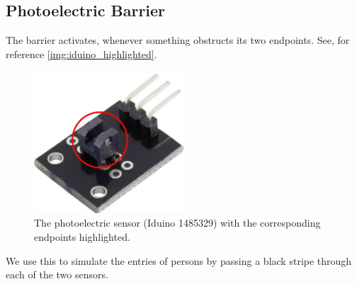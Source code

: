 \documentclass[]{article}
\begin{document}
\begin{sloppypar}
\subsection{Photoelectric Barrier}
The barrier activates, whenever something obstructs its two endpoints. See, for reference \eqref{img:iduino_highlighted}.\\
\begin{figure}[p]
	\centering
	\includegraphics[width=0.5\textwidth, keepaspectratio]{./images/iduino_highlighted.png}
	\caption{The photoelectric sensor (Iduino 1485329) with the corresponding endpoints highlighted.}\label{img:iduino_highlighted}
\end{figure}	
We use this to simulate the entries of persons by passing a black stripe through each of the two sensors.

\end{sloppypar}
\end{document}
